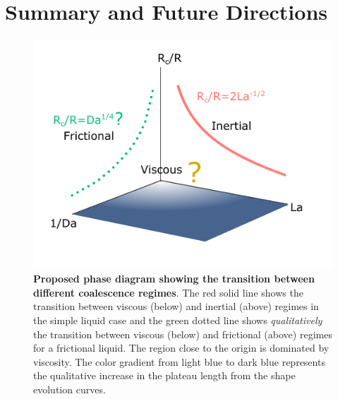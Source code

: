 \documentclass[%
reprint,
amsmath,amssymb,
aps,
]{revtex4-2}
\begin{document}
	
	\section{Summary and Future Directions}  
	\label{sec:future}
 \begin{figure}[h]
		\centering
		\includegraphics[width=\columnwidth]{Figure10.pdf}
		\caption{\textbf{Proposed phase diagram showing the transition between different coalescence regimes}. The red solid line shows the transition between viscous (below) and inertial (above) regimes in the simple liquid case and the green dotted line shows \emph{qualitatively} the transition between viscous (below) and frictional (above) regimes for a frictional liquid. The region close to the origin is dominated by viscosity. The color gradient from light blue to dark blue represents the qualitative increase in the plateau length from the shape evolution curves.}
		\label{fig:summary}
	\end{figure}
\end{document}
